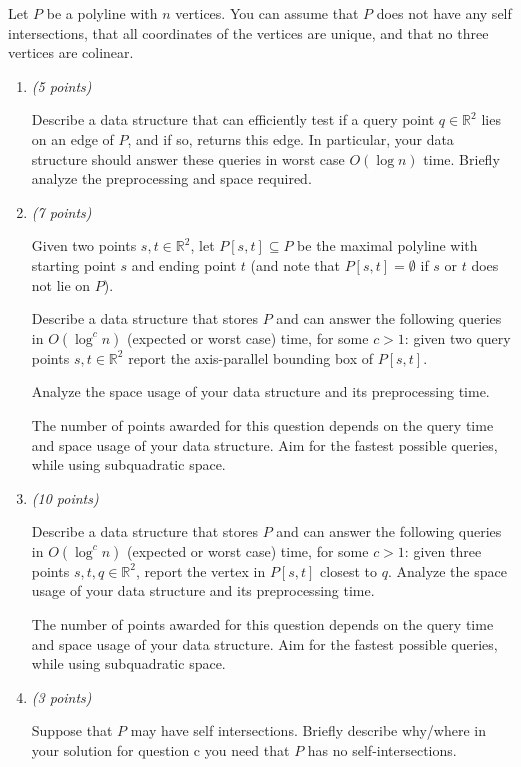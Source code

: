 \documentclass{article}
\newcommand{\withpoints}[1]{%
  \addtocounter{pointscounter}{#1} \printpoints{#1}
}
\newcommand{\printpoints}[1]{%
   \ifthenelse{#1 = 0}
              {}
              {\textit{(#1 points)}}\mbox{}
}
\newenvironment{question}[1][0]{\begin{tcolorbox}[parbox=false
                                      ,breakable=true
                                      ,enhanced jigsaw
                                      ,title=\bfseries Question
                                      \stepcounter{questionscounter}\arabic{questionscounter}
                                      \withpoints{#1}]
                         }
                         {\end{tcolorbox}}
\newenvironment{subquestions}{\begin{enumerate}[leftmargin=*
                                        ]}
                             {\end{enumerate}}
\newcommand{\subquestion}[1][0]{\item \withpoints{#1}}
\newcommand{\mkmbb}[1]{\ensuremath{\mathbb{#1}}\xspace}
\newcommand{\R}{\mkmbb{R}}
\begin{document}
  \begin{question}
    Let $P$ be a polyline with $n$ vertices. You can assume that $P$
    does not have any self intersections, that all coordinates of the
    vertices are unique, and that no three vertices are colinear.

    \begin{subquestions}
      \subquestion[5] Describe a data structure that can efficiently test if
      a query point $q \in \R^2$ lies on an edge of $P$, and if so,
      returns this edge. In particular, your data structure should
      answer these queries in worst case $O(\log n)$ time. Briefly
      analyze the preprocessing and space required.

      \subquestion[7] Given two points $s,t \in \R^2$, let
      $P[s,t] \subseteq P$ be the maximal polyline with starting point
      $s$ and ending point $t$ (and note that $P[s,t] = \emptyset$ if
      $s$ or $t$ does not lie on $P$).

      Describe a data structure that stores $P$ and can answer the
      following queries in $O(\log^c n)$ (expected or worst case)
      time, for some $c > 1$: given two query points $s,t \in \R^2$
      report the axis-parallel bounding box of $P[s,t]$.

      Analyze the space usage of your data structure and its
      preprocessing time.

      The number of points awarded for this question depends on the
      query time and space usage of your data structure. Aim for the
      fastest possible queries, while using subquadratic space.

      \subquestion[10] Describe a data structure that stores $P$ and can
      answer the following queries in $O(\log^c n)$ (expected or worst
      case) time, for some $c > 1$: given three points
      $s,t,q \in \R^2$, report the vertex in $P[s,t]$ closest to
      $q$. Analyze the space usage of your data structure and its
      preprocessing time.

      The number of points awarded for this question depends on the
      query time and space usage of your data structure. Aim for the
      fastest possible queries, while using subquadratic space.

      \subquestion[3] Suppose that $P$ may have self intersections. Briefly
      describe why/where in your solution for question c you need that
      $P$ has no self-intersections.

    \end{subquestions}
  \end{question}
\end{document}
